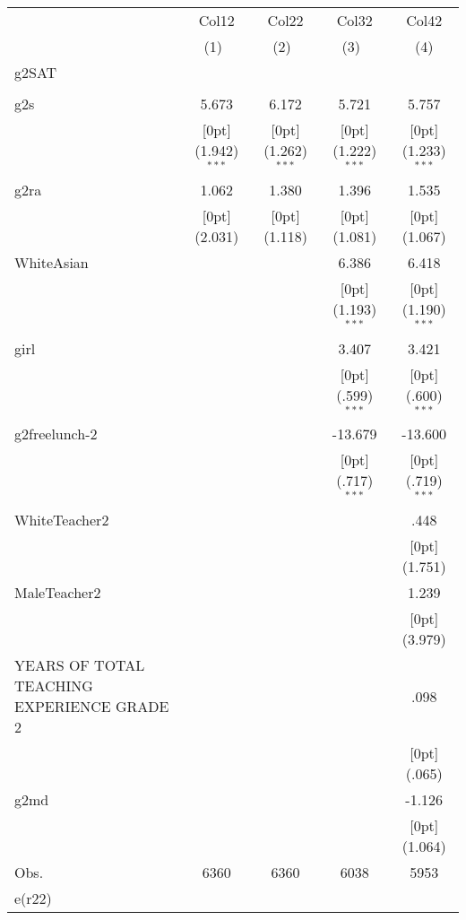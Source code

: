 \begin{tabular*}{\textwidth}{@{\extracolsep{\fill}}lcccc}				
	& \multicolumn{1}{c}{Col12} &	\multicolumn{1}{c}{Col22} &	\multicolumn{1}{c}{Col32} &	\multicolumn{1}{c}{Col42} \\
\cline{2-5}				
	& \multicolumn{1}{c}{(1)\mbox{\ }} &	\multicolumn{1}{c}{(2)\mbox{\ }} &	\multicolumn{1}{c}{(3)\mbox{\ }} &	\multicolumn{1}{c}{(4)} \\
\hline				
g2SAT &	&	&	&	\\
&	&	&	&	\\
g2s &	5.673 &	6.172 &	5.721 &	5.757 \\
&	\raisebox{.7ex}[0pt]{\scriptsize (1.942)$^{***}$} &	\raisebox{.7ex}[0pt]{\scriptsize (1.262)$^{***}$} &	\raisebox{.7ex}[0pt]{\scriptsize (1.222)$^{***}$} &	\raisebox{.7ex}[0pt]{\scriptsize (1.233)$^{***}$} \\
g2ra &	1.062 &	1.380 &	1.396 &	1.535 \\
&	\raisebox{.7ex}[0pt]{\scriptsize (2.031)} &	\raisebox{.7ex}[0pt]{\scriptsize (1.118)} &	\raisebox{.7ex}[0pt]{\scriptsize (1.081)} &	\raisebox{.7ex}[0pt]{\scriptsize (1.067)} \\
WhiteAsian &	&	&	6.386 &	6.418 \\
&	&	&	\raisebox{.7ex}[0pt]{\scriptsize (1.193)$^{***}$} &	\raisebox{.7ex}[0pt]{\scriptsize (1.190)$^{***}$} \\
girl &	&	&	3.407 &	3.421 \\
&	&	&	\raisebox{.7ex}[0pt]{\scriptsize (.599)$^{***}$} &	\raisebox{.7ex}[0pt]{\scriptsize (.600)$^{***}$} \\
g2freelunch-2 &	&	&	-13.679 &	-13.600 \\
&	&	&	\raisebox{.7ex}[0pt]{\scriptsize (.717)$^{***}$} &	\raisebox{.7ex}[0pt]{\scriptsize (.719)$^{***}$} \\
WhiteTeacher2 &	&	&	&	.448 \\
&	&	&	&	\raisebox{.7ex}[0pt]{\scriptsize (1.751)} \\
MaleTeacher2 &	&	&	&	1.239 \\
&	&	&	&	\raisebox{.7ex}[0pt]{\scriptsize (3.979)} \\
YEARS OF TOTAL TEACHING EXPERIENCE GRADE 2 &	&	&	&	.098 \\
&	&	&	&	\raisebox{.7ex}[0pt]{\scriptsize (.065)} \\
g2md &	&	&	&	-1.126 \\
&	&	&	&	\raisebox{.7ex}[0pt]{\scriptsize (1.064)} \\
Obs. &	6360 &	6360 &	6038 &	5953 \\
e(r22) &	&	&	&	\\
\hline\hline				
\end{tabular*}%

